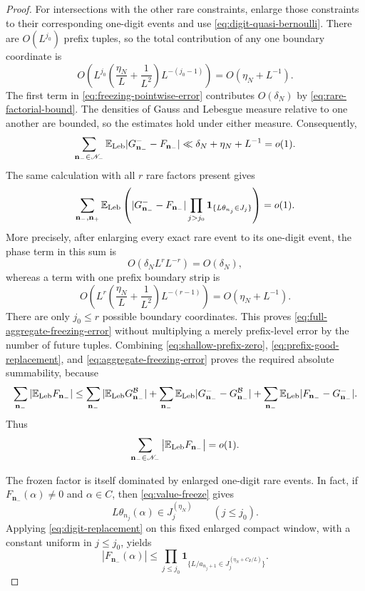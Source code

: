 \documentclass[11pt]{article}
\numberwithin{equation}{section}
\theoremstyle{definition}
\newcommand{\E}{\mathbb E}
\newcommand{\1}{\mathbf 1}
\begin{document}
\begin{proof}
For intersections with the other rare constraints, enlarge those
constraints to their corresponding one-digit events and use
\eqref{eq:digit-quasi-bernoulli}.  There are \(O(L^{j_0})\) prefix
tuples, so the total contribution of any one boundary coordinate is
\[
 O\left(
 L^{j_0}
 \left(\frac{\eta_N}{L}+\frac1{L^2}\right)
 L^{-(j_0-1)}
 \right)
 =O(\eta_N+L^{-1}).
\]
The first term in \eqref{eq:freezing-pointwise-error} contributes
\(O(\delta_N)\) by \eqref{eq:rare-factorial-bound}.  The densities
of Gauss and Lebesgue measure relative to one another are bounded, so
the estimates hold under either measure.  Consequently,
\begin{equation}\label{eq:aggregate-freezing-error}
 \sum_{\mathbf n_-\in\mathscr N_-}
 \E_{\rm Leb}|G^-_{\mathbf n_-}-F_{\mathbf n_-}|
 \ll\delta_N+\eta_N+L^{-1}=o(1).
\end{equation}
The same calculation with all \(r\) rare factors present gives
\begin{equation}\label{eq:full-aggregate-freezing-error}
 \sum_{\mathbf n_-,\mathbf n_+}
 \E_{\rm Leb}\left(
 |G^-_{\mathbf n_-}-F_{\mathbf n_-}|
 \prod_{j>j_0}\1_{\{L\theta_{n_j}\in J_j\}}\right)
 =o(1).
\end{equation}
More precisely, after enlarging every exact rare event to its
one-digit event, the phase term in this sum is
\[
 O(\delta_N L^rL^{-r})=O(\delta_N),
\]
whereas a term with one prefix boundary strip is
\[
 O\left(
 L^r\left(\frac{\eta_N}{L}+\frac1{L^2}\right)
 L^{-(r-1)}\right)
 =O(\eta_N+L^{-1}).
\]
There are only \(j_0\le r\) possible boundary coordinates.  This proves
\eqref{eq:full-aggregate-freezing-error} without multiplying a merely
prefix-level error by the number of future tuples.
Combining
\eqref{eq:shallow-prefix-zero},
\eqref{eq:prefix-good-replacement}, and
\eqref{eq:aggregate-freezing-error} proves the required absolute
summability, because
\[
 \sum_{\mathbf n_-}|\E_{\rm Leb}F_{\mathbf n_-}|
 \le
 \sum_{\mathbf n_-}|\E_{\rm Leb}G^{\mathcal B}_{\mathbf n_-}|
 +\sum_{\mathbf n_-}\E_{\rm Leb}
       |G^-_{\mathbf n_-}-G^{\mathcal B}_{\mathbf n_-}|
 +\sum_{\mathbf n_-}\E_{\rm Leb}
       |F_{\mathbf n_-}-G^-_{\mathbf n_-}|.
\]
Thus
\begin{equation}\label{eq:prefix-zero}
 \sum_{\mathbf n_-\in\mathscr N_-}
 \left|\E_{\rm Leb}F_{\mathbf n_-}\right|=o(1).
\end{equation}

The frozen factor is itself dominated by enlarged one-digit rare
events.  In fact, if \(F_{\mathbf n_-}(\alpha)\ne0\) and
\(\alpha\in C\), then
\eqref{eq:value-freeze} gives
\[
 L\theta_{n_j}(\alpha)\in J_j^{(\eta_N)}
 \qquad(j\le j_0).
\]
Applying \eqref{eq:digit-replacement} on this fixed enlarged compact
window, with a constant uniform in \(j\le j_0\), yields
\begin{equation}\label{eq:frozen-prefix-digit-domination}
 |F_{\mathbf n_-}(\alpha)|
 \le
 \prod_{j\le j_0}
 \1_{\{L/a_{n_j+1}\in
              J_j^{(\eta_N+C_{\mathbf J}/L)}\}}.
\end{equation}


\end{proof}
\end{document}

